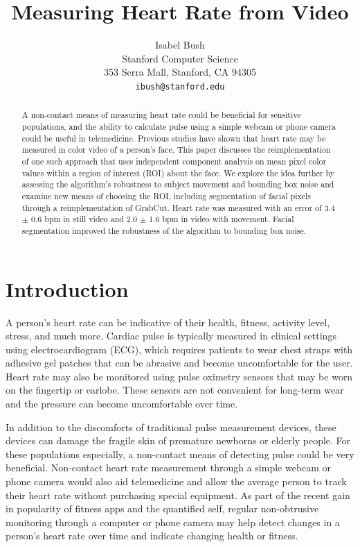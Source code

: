 \documentclass[10pt,twocolumn,letterpaper]{article}
\begin{document}
\title{Measuring Heart Rate from Video}

\author{Isabel Bush\\
Stanford Computer Science\\
353 Serra Mall, Stanford, CA 94305\\
{\tt\small ibush@stanford.edu}
}

\maketitle


\begin{abstract}
A non-contact means of measuring heart rate could be beneficial for sensitive populations, and the ability to calculate pulse using a simple webcam or phone camera could be useful in telemedicine. Previous studies have shown that heart rate may be measured in color video of a person's face. This paper discusses the reimplementation of one such approach that uses independent component analysis on mean pixel color values within a region of interest (ROI) about the face. We explore the idea further by assessing the algorithm's robustness to subject movement and bounding box noise and examine new means of choosing the ROI, including segmentation of facial pixels through a reimplementation of GrabCut. Heart rate was measured with an error of 3.4 $\pm$ 0.6 bpm in still video and 2.0 $\pm$ 1.6 bpm in video with movement. Facial segmentation improved the robustness of the algorithm to bounding box noise.

\end{abstract}

\section{Introduction}

A person's heart rate can be indicative of their health, fitness, activity level, stress, and much more. Cardiac pulse is typically measured in clinical settings using electrocardiogram (ECG), which requires patients to wear chest straps with adhesive gel patches that can be abrasive and become uncomfortable for the user. Heart rate may also be monitored using pulse oximetry sensors that may be worn on the fingertip or earlobe. These sensors are not convenient for long-term wear and the pressure can become uncomfortable over time.

In addition to the discomforts of traditional pulse measurement devices, these devices can damage the fragile skin of premature newborns or elderly people. For these populations especially, a non-contact means of detecting pulse could be very beneficial. Non-contact heart rate measurement through a simple webcam or phone camera would also aid telemedicine and allow the average person to track their heart rate without purchasing special equipment. As part of the recent gain in popularity of fitness apps and the quantified self, regular non-obtrusive monitoring through a computer or phone camera may help detect changes in a person's heart rate over time and indicate changing health or fitness. 
\end{document}
